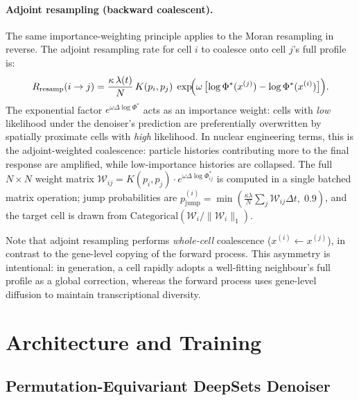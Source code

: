 \documentclass[11pt]{article}
\begin{document}
\paragraph{Adjoint resampling (backward coalescent).}
The same importance-weighting principle applies to the Moran resampling in reverse.
The adjoint resampling rate for cell $i$ to coalesce onto cell $j$'s full profile is:
\begin{equation}
  R_{\text{resamp}}(i \to j) = \frac{\kappa\,\lambda(t)}{N}\,K(p_i, p_j)\;
    \exp\!\Bigl(\omega\,\bigl[\log\Phi^*(x^{(j)}) - \log\Phi^*(x^{(i)})\bigr]\Bigr).
  \label{eq:adjoint_resamp}
\end{equation}
The exponential factor $e^{\omega\Delta\log\Phi^*}$ acts as an importance weight: cells with \emph{low} likelihood under the denoiser's prediction are preferentially overwritten by spatially proximate cells with \emph{high} likelihood.
In nuclear engineering terms, this is the adjoint-weighted coalescence: particle histories contributing more to the final response are amplified, while low-importance histories are collapsed.
The full $N \times N$ weight matrix $\mathcal{W}_{ij} = K(p_i, p_j)\cdot e^{\omega\Delta\log\Phi^*_{ij}}$ is computed in a single batched matrix operation; jump probabilities are $p_{\text{jump}}^{(i)} = \min(\frac{\kappa\lambda}{N}\sum_j\mathcal{W}_{ij}\Delta t,\;0.9)$, and the target cell is drawn from $\text{Categorical}(\mathcal{W}_i/\|\mathcal{W}_i\|_1)$.

Note that adjoint resampling performs \emph{whole-cell} coalescence ($x^{(i)} \leftarrow x^{(j)}$), in contrast to the gene-level copying of the forward process. This asymmetry is intentional: in generation, a cell rapidly adopts a well-fitting neighbour's full profile as a global correction, whereas the forward process uses gene-level diffusion to maintain transcriptional diversity.

\section{Architecture and Training}
\label{sec:training}

\subsection{Permutation-Equivariant DeepSets Denoiser}
\end{document}
